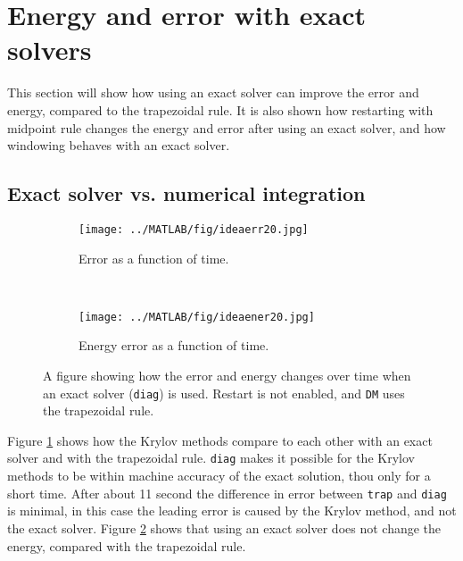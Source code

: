 \section{Energy and error with exact solvers} %
\label{sec:diag}
This section will show how using an exact solver can improve the error and energy, compared to the trapezoidal rule. It is also shown how restarting with midpoint rule changes the energy and error after using an exact solver, and how windowing behaves with an exact solver. %

\subsection{Exact solver vs. numerical integration}%
\begin{figure}[H]
        \centering
        \begin{subfigure}[b]{0.45\textwidth}
                \texttt{[image: ../MATLAB/fig/ideaerr20.jpg]}
                \caption{ Error as a function of time. }
                \label{fig:ideaerr20}
        \end{subfigure}%
        ~
        \begin{subfigure}[b]{0.45\textwidth}
                \texttt{[image: ../MATLAB/fig/ideaener20.jpg]}
                \caption{ Energy error as a function of time. }
                \label{fig:ideaener20}
        \end{subfigure}
       
        \caption{ A figure showing how the error and energy changes over time when an exact solver (\texttt{diag}) is used. Restart is not enabled, and \texttt{DM} uses the trapezoidal rule.  }
        \label{fig:idea0}
\end{figure}

\noindent Figure \ref{fig:ideaerr20} shows how the Krylov methods compare to each other with an exact solver and with the trapezoidal rule. \texttt{diag} makes it possible for the Krylov methods to be within machine accuracy of the exact solution, thou only for a short time. After about 11 second the difference in error between \texttt{trap} and \texttt{diag} is minimal, in this case the leading error is caused by the Krylov method, and not the exact solver. 
Figure \ref{fig:ideaener20} shows that using an exact solver does not change the energy, compared with the trapezoidal rule.





